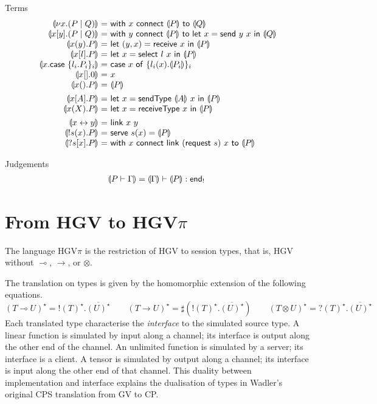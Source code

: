 \documentclass{easychair}
\makeatletter
\newcommand{\ba}{\begin{array}}
\newcommand{\ea}{\end{array}}
\newenvironment{equations}{\[\ba{@{}r@{~}c@{~}l@{}}}{\ea\]}
\newcommand{\key}{\mathsf}
\newcommand{\set}[1]{\{ #1 \}}
\newcommand{\cptogv}[1]{\llparenthesis{#1}\rrparenthesis}
\newcommand{\row}[2]{\set{#1}_{#2}}
\newcommand{\gvOutput}[2]{\mathord{!}{#1}.{#2}}
\newcommand{\gvInput}[2]{\mathord{?}{#1}.{#2}}
\newcommand{\gvEndOutput}{\key{end}_!}
\newcommand{\gvService}[1]{\sharp {#1}}
\newcommand{\gvDual}[1]{\overline{#1}}
\newcommand{\cpj}[2]{{#1} \vdash {#2}}
\newcommand{\gvj}[3]{{#1} \vdash {#2} : {#3}}
\newcommand{\la}{l}
\newcommand{\G}{\Gamma}
\newcommand{\lolli}{\multimap}
\newcommand{\gvLinFun}[2]{{#1} \lolli {#2}}
\newcommand{\gvUnFun}[2]{{#1} \to {#2}}
\newcommand{\gvTimes}[2]{{#1} \otimes {#2}}
\newcommand{\gvLink}[2]{\key{link}~{#1}~{#2}}
\newcommand{\gvPair}[2]{({#1},{#2})}
\newcommand{\gvLet}[3]{\key{let}~{#1}={#2}~\key{in}~{#3}}
\newcommand{\gvSend}[2]{\key{send}~{#1}~{#2}}
\newcommand{\gvReceive}[1]{\key{receive}~{#1}}
\newcommand{\gvSelect}[2]{\key{select}~{#1}~{#2}}
\newcommand{\gvCase}[2]{\key{case}~{#1}~\key{of}~{#2}}
\newcommand{\gvWith}[3]{\key{with}~{#1}~\key{connect}~{#2}~\key{to}~{#3}}
\newcommand{\gvTerminate}[1]{\key{terminate}~{#1}}
\newcommand{\gvSendType}[2]{\key{sendType}~{#1}~{#2}}
\newcommand{\gvReceiveType}[1]{\key{receiveType}~{#1}}
\newcommand{\gvServe}[3]{\key{serve}~{#1}({#2})={#3}}
\newcommand{\gvRequest}[1]{\key{request}~{#1}}
\newcommand{\cpLink}[2]{{#1} \leftrightarrow {#2}}
\newcommand{\cpCut}[3]{\nu {#1}.({#2} \mid {#3})}
\newcommand{\cpOutput}[4]{{#1}[{#2}].({#3} \mid {#4})}
\newcommand{\cpInput}[3]{{#1}({#2}).{#3}}
\newcommand{\cpInject}[3]{{#1}[{#2}].{#3}}
\newcommand{\cpCase}[2]{{#1}.\key{case}~{#2}}
\newcommand{\cpServe}[3]{!{#1}({#2}).{#3}}
\newcommand{\cpRequest}[3]{?{#1}[{#2}].{#3}}
\newcommand{\cpEmptyOut}[1]{{#1}[].0}
\newcommand{\cpEmptyIn}[2]{{#1}().{#2}}
\newcommand{\cpSendType}[3]{{#1}[{#2}].{#3}}
\newcommand{\cpReceiveType}[3]{{#1}({#2}).{#3}}
\newcommand{\hgv}{HGV\xspace}
\newcommand{\hgvpi}{HGV$\pi$\xspace}
\makeatother
\begin{document}
Terms
\begin{equations}
\cptogv{\cpCut{x}{P}{Q}} &=&
  \gvWith{x}{\cptogv{P}}{\cptogv{Q}} \\
\cptogv{\cpOutput{x}{y}{P}{Q}} &=&
  \gvWith{y}{\cptogv{P}}{\gvLet{x}{\gvSend{y}{x}}{\cptogv{Q}}} \\
\cptogv{\cpInput{x}{y}{P}} &=&
  \gvLet{\gvPair{y}{x}}{\gvReceive{x}}{\cptogv{P}} \\
\cptogv{\cpInject{x}{\la}{P}} &=&
  \gvLet{x}{\gvSelect{\la}{x}}{\cptogv{P}} \\
\cptogv{\cpCase{x}{\row{\la_i.P_i}{i}}} &=&
  \gvCase{x}{\row{\la_i(x).\cptogv{P_i}}{i}} \\
\cptogv{\cpEmptyOut{x}} &=& x \\
\cptogv{\cpEmptyIn{x}{P}} &=& \cptogv{P} \\[1ex]

\cptogv{\cpSendType{x}{A}{P}} &=&
  \gvLet{x}{\gvSendType{\cptogv{A}}{x}}{\cptogv{P}} \\
\cptogv{\cpReceiveType{x}{X}{P}} &=&
  \gvLet{x}{\gvReceiveType{x}}{\cptogv{P}} \\[1ex]

\cptogv{\cpLink{x}{y}} &=& \gvLink{x}{y} \\
\cptogv{\cpServe{s}{x}{P}} &=&
  \gvServe{s}{x}{\cptogv{P}} \\
\cptogv{\cpRequest{s}{x}{P}} &=&
  \gvWith{x}{\gvLink{(\gvRequest{s})}{x}}{\cptogv{P}} \\
\end{equations}

Judgements
\begin{equations}
\cptogv{\cpj{P}{\G}} = \gvj{\cptogv{\G}}{\cptogv{P}}{\gvEndOutput}
\end{equations}

\section{From \hgv to \hgvpi}

\newcommand{\lampi}[1]{({#1})^\star}


The language \hgvpi is the restriction of \hgv to session types,
that is, \hgv without $\lolli$, $\to$, or $\otimes$.

The translation on types is given by the homomorphic extension of the
following equations.
\[
\lampi{\gvLinFun{T}{U}} = \gvOutput{\lampi{T}}{\gvDual{\lampi{U}}} \qquad
\lampi{\gvUnFun{T}{U}} = \gvService{(\gvOutput{\lampi{T}}{\gvDual{\lampi{U}}})} \qquad
\lampi{\gvTimes{T}{U}} = \gvInput{\lampi{T}}{\gvDual{\lampi{U}}}
\]%
Each translated type characterise the \emph{interface} to the
simulated source type. A linear function is simulated by input along a
channel; its interface is output along the other end of the channel.
An unlimited function is simulated by a server; its interface is a
client. A tensor is simulated by output along a channel; its interface
is input along the other end of that channel.
%
This duality between implementation and interface explains the
dualisation of types in Wadler's original CPS translation from GV to
CP.
\end{document}
